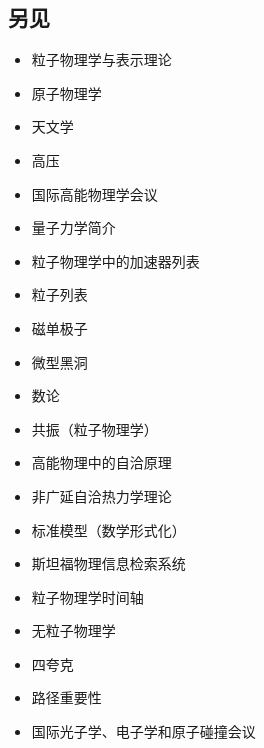 \subsection{另见}
\begin{itemize}
\item 粒子物理学与表示理论
\item 原子物理学
\item 天文学
\item 高压
\item 国际高能物理学会议
\item 量子力学简介
\item 粒子物理学中的加速器列表
\item 粒子列表
\item 磁单极子
\item 微型黑洞
\item 数论
\item 共振（粒子物理学）
\item 高能物理中的自洽原理
\item 非广延自洽热力学理论
\item 标准模型（数学形式化）
\item 斯坦福物理信息检索系统
\item 粒子物理学时间轴
\item 无粒子物理学
\item 四夸克
\item 路径重要性
\item 国际光子学、电子学和原子碰撞会议
\end{itemize}

